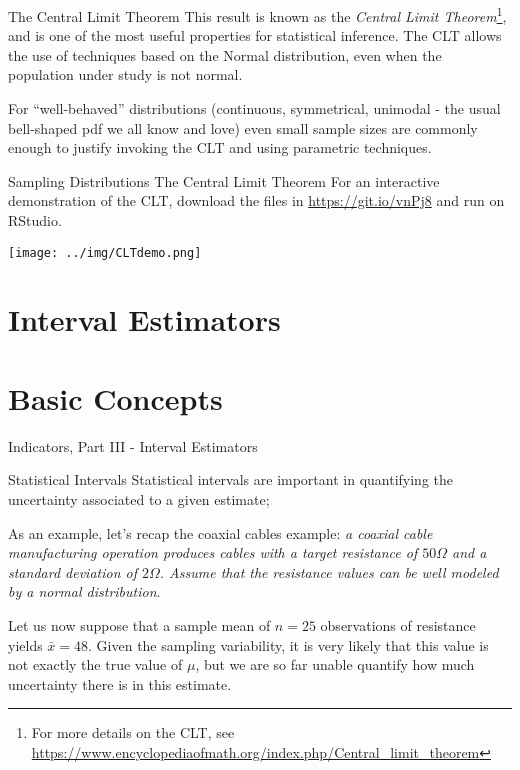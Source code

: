 \begin{frame}
{The Central Limit Theorem}
This result is known as the \textit{Central Limit Theorem}\footnote{For more details on the CLT, see \url{https://www.encyclopediaofmath.org/index.php/Central_limit_theorem}}, and is one of the most useful properties for statistical inference. The CLT allows the use of techniques based on the Normal distribution, even when the population under study is not normal.\bigskip

For ``well-behaved'' distributions (continuous, symmetrical, unimodal - the usual bell-shaped pdf we all know and love) even small sample sizes are commonly enough to justify invoking the CLT and using parametric techniques.\bigskip
\end{frame}

\begin{frame}
{Sampling Distributions}
{The Central Limit Theorem}
For an interactive demonstration of the CLT, download the files in {\small\url{https://git.io/vnPj8}} and run on RStudio.
\bigskip

{\centering\texttt{[image: ../img/CLTdemo.png]}}
\end{frame}

\section{Interval Estimators}
\section{Basic Concepts}
\begin{frame}
  \begin{center}
    Indicators, Part III - Interval Estimators
  \end{center}
\end{frame}


\begin{frame}{Statistical Intervals}
Statistical intervals are important in quantifying the uncertainty associated to a given estimate;
\bigskip

As an example, let's recap the coaxial cables example: \textit{a coaxial cable manufacturing operation produces cables with a target resistance of $50\Omega$ and a standard deviation of $2\Omega$. Assume that the resistance values can be well modeled by a normal distribution}.
\bigskip

Let us now suppose that a sample mean of $n=25$ observations of resistance  yields $\bar{x} = 48$. Given the sampling variability, it is very likely that this value is not exactly the true value of $\mu$, but we are so far unable quantify how much uncertainty there is in this estimate.
\end{frame}

